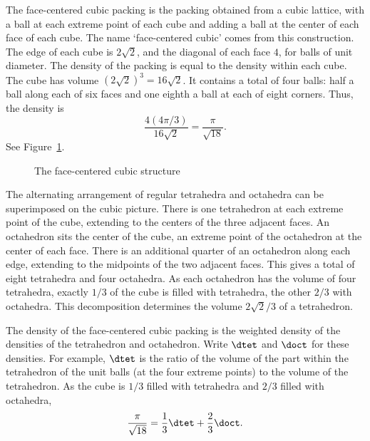 The face-centered cubic packing is the packing obtained from a cubic
lattice, with a ball at each extreme point of each cube and adding a
ball at the center of each face of each cube.  The name `face-centered
cubic' comes from this construction.  The edge of each cube is
$2\sqrt2$, and the diagonal of each face $4$, for balls of unit
diameter.  The density of the packing is equal to the density within
each cube.  The cube has volume $(2\sqrt2)^3 = 16\sqrt2$.  It contains
a total of four balls: half a ball along each of six faces and one
eighth a ball at each of eight corners.  Thus, the density is
   \begin{displaymath}
   \frac{   4 (4\pi/3)}{16\sqrt2} = \frac{\pi}{\sqrt{18}}.
   \end{displaymath}
See Figure~\ref{fig:fcc-cube}.

\begin{figure}[htb]
  \centering
  \caption{The face-centered cubic structure}
  \label{fig:fcc-cube}
\end{figure}

The alternating arrangement of regular tetrahedra and octahedra can be
superimposed on the cubic picture.  There is one tetrahedron at each
extreme point of the cube, extending to the centers of the three
adjacent faces.  An octahedron sits the center of the cube, an extreme
point of the octahedron at the center of each face.  There is an
additional quarter of an octahedron along each edge, extending to the
midpoints of the two adjacent faces.  This gives a total of eight
tetrahedra and four octahedra.  As each octahedron has the volume of
four tetrahedra, exactly $1/3$ of the cube is filled with tetrahedra,
the other $2/3$ with octahedra.  This decomposition determines the
volume $2\sqrt2/3$ of a tetrahedron.

The density of the face-centered cubic packing is the weighted density
of the densities of the tetrahedron and octahedron.  Write $\dtet$ and
$\doct$ for these densities.  For example, $\dtet$ is the ratio of the
volume of the part within the tetrahedron of the unit balls (at the
four extreme points) to the volume of the tetrahedron.  As the cube is
$1/3$ filled with tetrahedra and $2/3$ filled with octahedra,
\begin{displaymath}
  \frac{\pi}{\sqrt{18}} = \frac{1}{3}\dtet + \frac{2}{3}\doct.
\end{displaymath}

